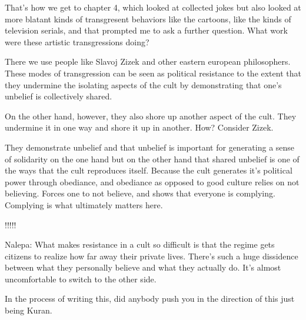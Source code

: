 \documentclass{article}
\begin{document}
\vspace{5mm}

That's how we get to chapter 4, which looked at collected jokes but also looked at more blatant kinds of transgresent behaviors like the cartoons, like the kinds of television serials, and that prompted me to ask a further question.  What work were these artistic transgressions doing?  

\vspace{5mm}

There we use people like Slavoj Zizek and other eastern european philosophers.  These modes of transgression can be seen as political resistance to the extent that they undermine the isolating aspects of the cult by demonstrating that one's unbelief is collectively shared.  

\vspace{5mm}

On the other hand, however, they also shore up another aspect of the cult.  They undermine it in one way and shore it up in another.  How?  Consider Zizek.  

\vspace{5mm}

They demonstrate unbelief and that unbelief is important for generating a sense of solidarity on the one hand but on the other hand that shared unbelief is one of the ways that the cult reproduces itself.  Because the cult generates it's political power through obediance, and obediance as opposed to good culture relies on not believing.  Forces one to not believe, and shows that everyone is complying.  Complying is what ultimately matters here.  

\vspace{5mm}

!!!!!

\vspace{5mm}

Nalepa: 
What makes resistance in a cult so difficult is that the regime gets citizens to realize how far away their private lives.  There's such a huge dissidence between what they personally believe and what they actually do.  It's almost uncomfortable to switch to the other side.  

\vspace{5mm}

In the process of writing this, did anybody push you in the direction of this just being Kuran.  

\vspace{5mm}
\end{document}
